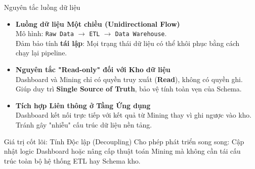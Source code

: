 \begin{frame}{Nguyên tắc luồng dữ  liệu}
  \begin{itemize}
      \item \textbf{Luồng dữ liệu Một chiều (Unidirectional Flow)} \\
      Mô hình: \texttt{Raw Data} $\rightarrow$ \texttt{ETL} $\rightarrow$ \texttt{Data Warehouse}. \\
      Đảm bảo tính \textbf{tái lập}: Mọi trạng thái dữ liệu có thể khôi phục bằng cách chạy lại pipeline.
  
      \item \textbf{Nguyên tắc "Read-only" đối với Kho dữ liệu} \\
      Dashboard và Mining chỉ có quyền truy xuất (\textbf{Read}), không có quyền ghi. \\
      Giúp duy trì \textbf{Single Source of Truth}, bảo vệ tính toàn vẹn của Schema.
  
      \item \textbf{Tích hợp Liên thông ở Tầng Ứng dụng} \\
      Dashboard kết nối trực tiếp với kết quả từ Mining thay vì ghi ngược vào kho. Tránh gây "nhiễu" cấu trúc dữ liệu nền tảng.
  \end{itemize}
  
  \vspace{2mm}
  \begin{alertblock}{Giá trị cốt lõi: Tính Độc lập (Decoupling)}
      Cho phép phát triển song song: Cập nhật logic Dashboard hoặc nâng cấp thuật toán Mining mà không cần tái cấu trúc toàn bộ hệ thống ETL hay Schema kho.
  \end{alertblock}
  \end{frame}

